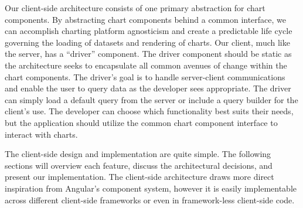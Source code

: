 %
%

Our client-side architecture consists of one primary abstraction for chart components.  By abstracting chart components behind a common interface, we can accomplish charting platform agnosticism and create a predictable life cycle governing the loading of datasets and rendering of charts.  Our client, much like the server, has a “driver” component.  The driver component should be static as the architecture seeks to encapsulate all common avenues of change within the chart components.  The driver’s goal is to handle server-client communications and enable the user to query data as the developer sees appropriate.  The driver can simply load a default query from the server or include a query builder for the client’s use.  The developer can choose which functionality best suits their needs, but the application should utilize the common chart component interface to interact with charts. \par
The client-side design and implementation are quite simple. The following sections will overview each feature, discuss the architectural decisions, and present our implementation.  The client-side architecture draws more direct inspiration from Angular’s component system, however it is easily implementable across different client-side frameworks or even in framework-less client-side code. \par

